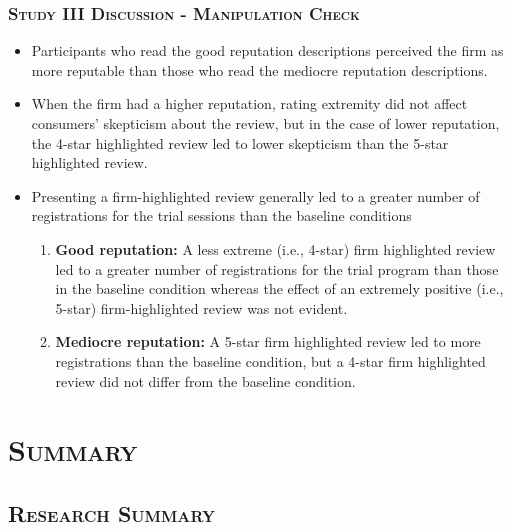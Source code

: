 \documentclass{../presentation}
\begin{document}
    \begin{frame}
        \frametitle{\textsc{Study III Discussion - Manipulation Check}}

        \small

        \begin{itemize}
            \item Participants who read the good reputation descriptions perceived the firm as more reputable than those who read the mediocre reputation descriptions.
            \item When the firm had a higher reputation, rating extremity did not affect consumers' skepticism about the review, but in the case of lower reputation, the 4-star highlighted review led to lower skepticism than the 5-star highlighted review.
            \item Presenting a firm-highlighted review generally led to a greater number of registrations for the trial sessions than the baseline conditions

            \begin{enumerate}
                \footnotesize
                \item \textbf{Good reputation: } A less extreme (i.e., 4-star) firm highlighted review led to a greater number of registrations for the trial program than those in the baseline condition whereas the effect of an extremely positive (i.e., 5-star) firm-highlighted review was not evident.
                \item \textbf{Mediocre reputation: } A 5-star firm highlighted review led to more registrations than the baseline condition, but a 4-star firm highlighted review did not differ from the baseline condition.
            \end{enumerate}
        \end{itemize}

    \end{frame}

    \section{\textsc{Summary}}

    \subsection{\textsc{Research Summary}}
\end{document}
